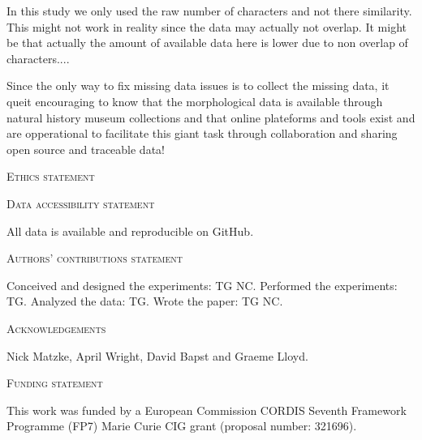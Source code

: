 \documentclass[12pt,letterpaper]{article}
\renewcommand{\section}[1]{%
\bigskip
\begin{center}
\begin{Large}
\normalfont\scshape #1
\medskip
\end{Large}
\end{center}}
\begin{document}

In this study we only used the raw number of characters and not there similarity. This might not work in reality since the data may actually not overlap. It might be that actually the amount of available data here is lower due to non overlap of characters....

Since the only way to fix missing data issues is to collect the missing data, it queit encouraging to know that the morphological data is available through natural history museum collections and that online plateforms and tools exist and are opperational to facilitate this giant task through collaboration and sharing open source and traceable data!



\section{Ethics statement}
\section{Data accessibility statement}
All data is available and reproducible on GitHub.
\section{Authors’ contributions statement}
Conceived and designed the experiments: TG NC. Performed the experiments: TG. Analyzed the data: TG. Wrote the paper: TG NC.
\section{Acknowledgements}
Nick Matzke, April Wright, David Bapst and Graeme Lloyd.
\section{Funding statement}
This work was funded by a European Commission CORDIS Seventh Framework Programme (FP7) Marie Curie CIG grant (proposal number: 321696).









\end{document}
